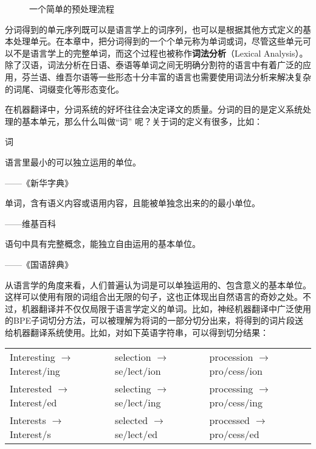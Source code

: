 \begin{figure}[htp]
\centering

\caption{一个简单的预处理流程}
\label{fig:3.2-1}
\end{figure}

\parinterval 分词得到的单元序列既可以是语言学上的词序列，也可以是根据其他方式定义的基本处理单元。在本章中，把分词得到的一个个单元称为单词或词，尽管这些单元可以不是语言学上的完整单词，而这个过程也被称作{\small\sffamily\bfseries{词法分析}}（Lexical Analysis）。除了汉语，词法分析在日语、泰语等单词之间无明确分割符的语言中有着广泛的应用，芬兰语、维吾尔语等一些形态十分丰富的语言也需要使用词法分析来解决复杂的词尾、词缀变化等形态变化。

\parinterval 在机器翻译中，分词系统的好坏往往会决定译文的质量。分词的目的是定义系统处理的基本单元，那么什么叫做“词” 呢？关于词的定义有很多，比如：

\vspace{0.5em}
\begin{definition} 词

\vspace{0.5em}
语言里最小的可以独立运用的单位。
\begin{flushright}——《新华字典》\end{flushright}

单词，含有语义内容或语用内容，且能被单独念出来的的最小单位。
\begin{flushright}——维基百科\end{flushright}

语句中具有完整概念，能独立自由运用的基本单位。
\begin{flushright}——《国语辞典》\end{flushright}
\end{definition}


\parinterval 从语言学的角度来看，人们普遍认为词是可以单独运用的、包含意义的基本单位。这样可以使用有限的词组合出无限的句子，这也正体现出自然语言的奇妙之处。不过，机器翻译并不仅仅局限于语言学定义的单词。比如，神经机器翻译中广泛使用的BPE子词切分方法，可以被理解为将词的一部分切分出来，将得到的词片段送给机器翻译系统使用。比如，对如下英语字符串，可以得到切分结果：

\vspace{0.8em}

\noindent
\begin{tabular}{l l l}
Interesting \; $\to$ \; Interest/ing & selection $\to$ \;se/lect/ion & procession $\to$ \; pro/cess/ion  \\
Interested $\to$ \; Interest/ed & selecting $\to$ \; se/lect/ing & processing $\to$ \; pro/cess/ing \\
Interests $\to$ \; Interest/s & selected $\to$ \; se/lect/ed & processed $\to$ \; pro/cess/ed
\end{tabular}

